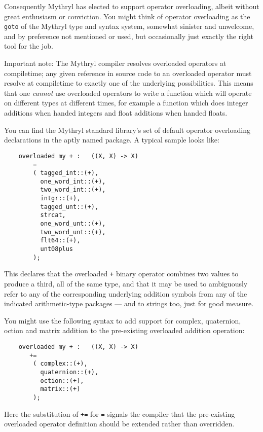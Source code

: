 Consequently Mythryl has elected to support operator overloading, albeit 
without great enthusiasm or conviction.  You might think of operator 
overloading as the {\tt goto} of the Mythryl type and syntax system, 
somewhat sinister and unwelcome, and by preference not mentioned or used, 
but occasionally just exactly the right tool for the job.

Important note:  The Mythryl compiler resolves overloaded operators at compiletime; 
any given reference in source code to an overloaded operator 
must resolve at compiletime to exactly one of the underlying possibilities. 
This means that one {\it cannot} use overloaded operators to write a function 
which will operate on different types at different times, for example a 
function which does integer additions when handed integers and float 
additions when handed floats.  

You can find the Mythryl standard library's set of default operator 
overloading declarations in the aptly named 
package.  A typical sample looks like:

\begin{verbatim}
    overloaded my + :   ((X, X) -> X)
        =
        ( tagged_int::(+),
          one_word_int::(+),
          two_word_int::(+),
          intgr::(+),
          tagged_unt::(+),
          strcat,
          one_word_unt::(+),
          two_word_unt::(+),
          flt64::(+),
          unt08plus
        );
\end{verbatim}

This declares that the overloaded {\tt +} binary operator combines two values to 
produce a third, all of the same type, and that it may be used to ambiguously 
refer to any of the corresponding underlying addition symbols from any of the indicated 
arithmetic-type packages --- and to strings too, just for good measure. 

You might use the following syntax to add support for complex, 
quaternion, oction and matrix addition to the pre-existing overloaded 
addition operation:

\begin{verbatim}
    overloaded my + :   ((X, X) -> X)
       +=
        ( complex::(+),
          quaternion::(+),
          oction::(+),
          matrix::(+)
        );
\end{verbatim}

Here the substitution of {\tt +=} for {\tt =} signals 
the compiler that the pre-existing overloaded operator definition 
should be extended rather than overridden.

